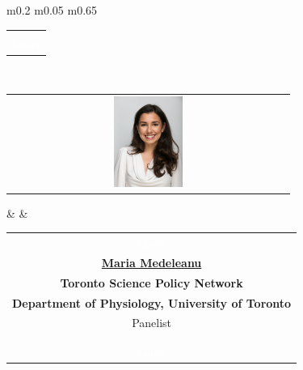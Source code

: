 \documentclass[titlepage,oneside,openany,10pt]{book}
\begin{document}
\begin{tabular}{  m{0.2\textwidth}  m{0.05\textwidth}  m{0.65\textwidth}  }
\begin{tabular}[c]{@{}c@{}}
\begin{tabularx}{\linewidth}{@{}XXX@{}}
\qquad Science Rendezvous, an annual event that brings science out of the lab across many Canadian cities, was founded by Dr. Miller in 2008, with the goal of improving student enrollment and public engagement in and with science. In the years since, the committee has had over 300 events with an incredible impact at making science accessible to the general public.\\
\textcolor{white}{Linux}
\end{tabularx}
\end{tabular}\\
\midrule
\begin{tabular}[c]{@{}c@{}} 
\includegraphics[width=0.25\textwidth]{Other_Figures/MMede.png} 
\end{tabular}		& 		
& \begin{tabular}[c]{@{}c@{}}
\textcolor{white}{Linux}\\
\textbf{\underline{Maria Medeleanu}}\\
\textbf{Toronto Science Policy Network}\\ 
\textbf{Department of Physiology, University of Toronto}\\
Panelist\\\\
\begin{tabularx}{\linewidth}{@{}XXX@{}}
Maria is a PhD Candidate at the Department of Physiology studying how early-life exposures affect immune development and pediatric asthma, and is pursuing a specialization in Public Health Policy at the Dalla Lana School of Public Health. Maria is also Marketing Director for the Toronto Science Policy Network, a student-run science policy group helping scientists at all levels to learn more about and engage in science policy.\\
\textcolor{white}{Linux}
\end{tabularx}
\end{tabular}\\
\bottomrule
\end{tabular}
\end{document}
